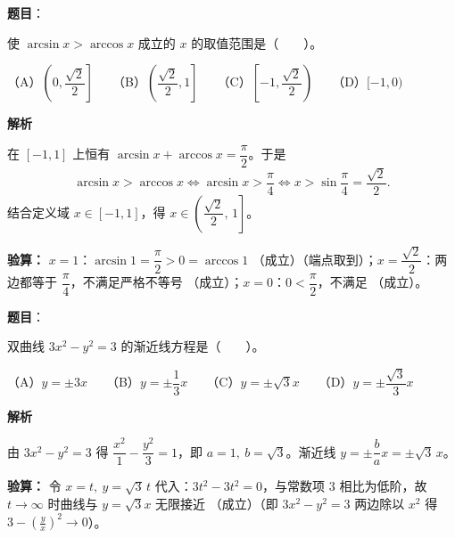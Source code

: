 \begin{answer}

\textbf{题目}：

使 $\arcsin x>\arccos x$ 成立的 $x$ 的取值范围是\mbox{（　　）}。

（A）$\left(0,\dfrac{\sqrt2}{2}\right]$　　（B）$\left(\dfrac{\sqrt2}{2},1\right]$　　（C）$\left[-1,\dfrac{\sqrt2}{2}\right)$　　（D）$[-1,0)$

\textbf{解析}

在 $[-1,1]$ 上恒有 $\arcsin x+\arccos x=\dfrac{\pi}{2}$。于是
\nopagebreak[4]
\[\arcsin x>\arccos x\iff \arcsin x>\frac{\pi}{4}\iff x>\sin\frac{\pi}{4}=\frac{\sqrt2}{2}.\]
结合定义域 $x\in[-1,1]$，得 $x\in\left(\dfrac{\sqrt2}{2},\,1\right]$。

\textbf{验算：} $x=1$：$\arcsin1=\dfrac{\pi}{2}>0=\arccos1$ （成立）（端点取到）；$x=\dfrac{\sqrt2}{2}$：两边都等于 $\dfrac{\pi}{4}$，不满足严格不等号 （成立）；$x=0$：$0<\dfrac{\pi}{2}$，不满足 （成立）。


\par\medskip

\end{answer}
\begin{answer}

\textbf{题目}：

双曲线 $3x^2-y^2=3$ 的渐近线方程是\mbox{（　　）}。

（A）$y=\pm3x$　　（B）$y=\pm\dfrac13x$　　（C）$y=\pm\sqrt3x$　　（D）$y=\pm\dfrac{\sqrt3}{3}x$

\textbf{解析}

由 $3x^2-y^2=3$ 得 $\dfrac{x^2}{1}-\dfrac{y^2}{3}=1$，即 $a=1,\ b=\sqrt3$。渐近线 $y=\pm\dfrac{b}{a}x=\pm\sqrt3\,x$。

\textbf{验算：} 令 $x=t,\ y=\sqrt3\,t$ 代入：$3t^2-3t^2=0$，与常数项 $3$ 相比为低阶，故 $t\to\infty$ 时曲线与 $y=\sqrt3 x$ 无限接近 （成立）（即 $3x^2-y^2=3$ 两边除以 $x^2$ 得 $3-\left(\frac yx\right)^2\to0$）。


\par\medskip

\end{answer}
